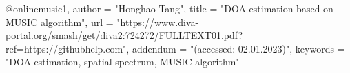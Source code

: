 @online{music1,
    author = "Honghao Tang",
    title = "DOA estimation based on MUSIC algorithm",
    url  = "https://www.diva-portal.org/smash/get/diva2:724272/FULLTEXT01.pdf?ref=https://githubhelp.com",
    addendum = "(accessed: 02.01.2023)",
    keywords = "DOA estimation, spatial spectrum, MUSIC algorithm"
}